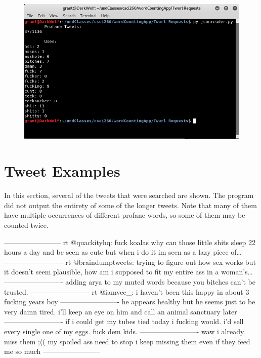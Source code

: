 \documentclass{article}
\begin{document}
\begin{figure}[h]
	\includegraphics[scale=2.59]{terminal}
\end{figure}

\section{Tweet Examples}
\tab In this section, several of the tweets that were searched are shown. The program did not output the entirety of some of the longer tweets. Note that many of them have multiple occurrences of different profane words, so some of them may be counted twice.\newline

\begin{flushleft}------------------------\newline
rt @quackityhq: fuck koalas why can those little shits sleep 22 hours a day and be seen as cute but when i do it im seen as a lazy piece of…\newline
-------------------------\newline
rt @braindumptweets: trying to figure out how sex works but it doesn't seem plausible, how am i supposed to fit my entire ass in a woman's…\newline
-------------------------\newline
adding arya to my muted words because you bitches can’t be trusted.\newline
-------------------------\newline
rt @iamvee\_: i haven’t been this happy in about 3 fucking years boy\newline
-------------------------\newline
he appears healthy but he seems just to be very damn tired. i'll keep an eye on him and call an animal sanctuary later\newline
-------------------------\newline
if i could get my tubes tied today i fucking would. i’d sell every single one of my eggs. fuck dem kids.\newline
-------------------------\newline
waw i already miss them ;(( my spoiled ass need to stop i keep missing them even if they feed me so much\newline
------------------------\newline
\end{flushleft}
\end{document}
